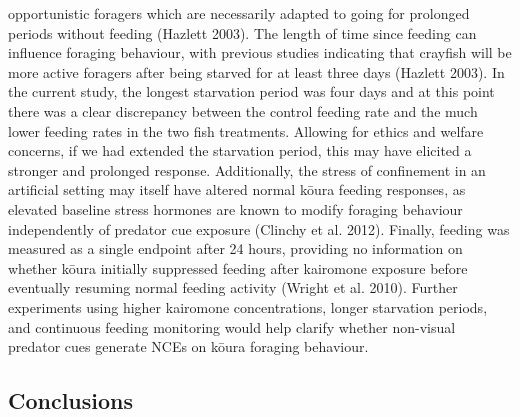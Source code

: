 \documentclass[
  12pt,
  a4paper,
  oneside]{scrbook}
\begin{document}
opportunistic foragers which are necessarily adapted to going for
prolonged periods without feeding (Hazlett 2003). The length of time
since feeding can influence foraging behaviour, with previous studies
indicating that crayfish will be more active foragers after being
starved for at least three days (Hazlett 2003). In the current study,
the longest starvation period was four days and at this point there was
a clear discrepancy between the control feeding rate and the much lower
feeding rates in the two fish treatments. Allowing for ethics and
welfare concerns, if we had extended the starvation period, this may
have elicited a stronger and prolonged response. Additionally, the
stress of confinement in an artificial setting may itself have altered
normal kōura feeding responses, as elevated baseline stress hormones are
known to modify foraging behaviour independently of predator cue
exposure (Clinchy et al. 2012). Finally, feeding was measured as a
single endpoint after 24 hours, providing no information on whether
kōura initially suppressed feeding after kairomone exposure before
eventually resuming normal feeding activity (Wright et al. 2010).
Further experiments using higher kairomone concentrations, longer
starvation periods, and continuous feeding monitoring would help clarify
whether non-visual predator cues generate NCEs on kōura foraging
behaviour.

\subsection{Conclusions}\label{conclusions}
\end{document}
